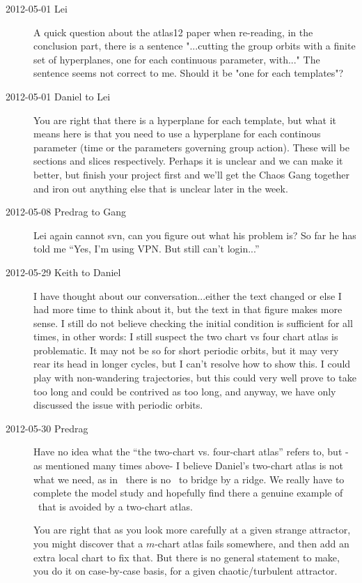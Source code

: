 \begin{description}
\item[2012-05-01 Lei] A quick question about the atlas12 paper when re-reading, in the conclusion part, there is a sentence "...cutting the group orbits with a finite set of hyperplanes, one for each continuous parameter, with..." The sentence seems not correct to me. Should it be "one for each templates"?

\item[2012-05-01 Daniel to Lei] You are right that there is a hyperplane for each template, but what it means here is that you need to use a hyperplane for each continous parameter (time or the parameters governing group action). These will be sections and slices respectively. Perhaps it is unclear and we can make it better, but finish your project first and we'll get the Chaos Gang together and iron out anything else that is unclear later in the week.

\item[2012-05-08 Predrag to Gang]  Lei again cannot svn, can you figure
out what his problem is? So far he has told me ``Yes, I'm using VPN. But
still can't login...''

\item[2012-05-29 Keith to Daniel]  I have thought about our
conversation...either the text changed or else I had more time to think
about it, but the text in that figure makes more sense.  I still do not
believe checking the initial condition is sufficient for all times, in
other words: I still suspect the two chart vs four chart atlas is
problematic.  It may not be so for short periodic orbits, but it may very
rear its head in longer cycles, but I can't resolve how to show this.  I
could play with non-wandering trajectories, but this could very well
prove to take too long and could be contrived as too long, and anyway, we
have only discussed the issue with periodic orbits.

\item[2012-05-30 Predrag] Have no idea what the ``the two-chart vs.
four-chart atlas'' refers to, but -as mentioned many times above- I
believe Daniel's two-chart atlas is not what we need, as in \cLf\ there
is no \chartBord\ to bridge by a ridge. We really have to complete the
{\twoMode} model study and hopefully find there a genuine example of
\chartBord\ that is avoided by a two-chart atlas.

You are right that  as you look more carefully at a given strange
attractor, you might discover that a $m$-chart atlas fails somewhere, and
then add an extra local chart to fix that. But there is no general
statement to make, you do it on case-by-case basis, for a given
chaotic/turbulent attractor.


\end{description}
